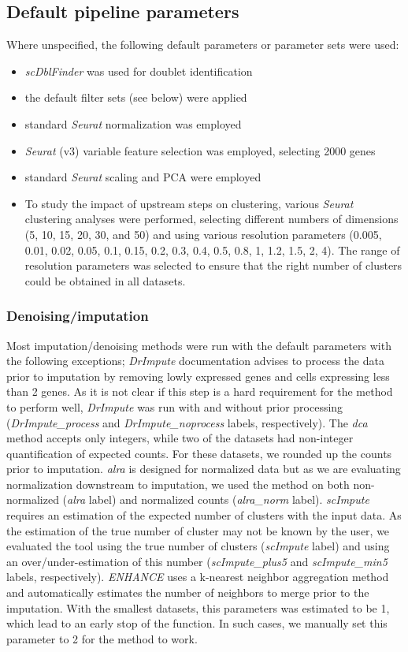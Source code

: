\documentclass{bmcart}
\begin{document}
\subsection*{Default pipeline parameters}

Where unspecified, the following default parameters or parameter sets were used:
\begin{itemize}
    \item \textit{scDblFinder} was used for doublet identification
    \item the default filter sets (see below) were applied
    \item standard \textit{Seurat} normalization was employed
    \item \textit{Seurat} (v3) variable feature selection was employed, selecting 2000 genes
    \item standard \textit{Seurat} scaling and PCA were employed
    \item To study the impact of upstream steps on clustering, various \textit{Seurat} clustering analyses were performed, selecting different numbers of dimensions (5, 10, 15, 20, 30, and 50) and using various resolution parameters (0.005, 0.01, 0.02, 0.05, 0.1, 0.15, 0.2, 0.3, 0.4, 0.5, 0.8, 1, 1.2, 1.5, 2, 4). The range of resolution parameters was selected to ensure that the right number of clusters could be obtained in all datasets.
\end{itemize}

\subsubsection*{Denoising/imputation}
Most imputation/denoising methods were run with the default parameters with the following exceptions; \textit{DrImpute} documentation advises to process the data prior to imputation by removing lowly expressed genes and cells expressing less than 2 genes. As it is not clear if this step is a hard requirement for the method to perform well, \textit{DrImpute} was run with and without prior processing (\textit{DrImpute\_process} and \textit{DrImpute\_noprocess} labels, respectively). The \textit{dca} method accepts only integers, while two of the datasets had non-integer quantification of expected counts. For these datasets, we rounded up the counts prior to imputation. \textit{alra} is designed for normalized data but as we are evaluating normalization downstream to imputation, we used the method on both non-normalized (\textit{alra} label) and normalized counts (\textit{alra\_norm} label). \textit{scImpute} requires an estimation of the expected number of clusters with the input data. As the estimation of the true number of cluster may not be known by the user, we evaluated the tool using the true number of clusters (\textit{scImpute} label) and using an over/under-estimation of this number (\textit{scImpute\_plus5} and \textit{scImpute\_min5} labels, respectively). \textit{ENHANCE} uses a k-nearest neighbor aggregation method and automatically estimates the number of neighbors to merge prior to the imputation. With the smallest datasets, this parameters was estimated to be 1, which lead to an early stop of the function. In such cases, we manually set this parameter to 2 for the method to work. 
\end{document}
